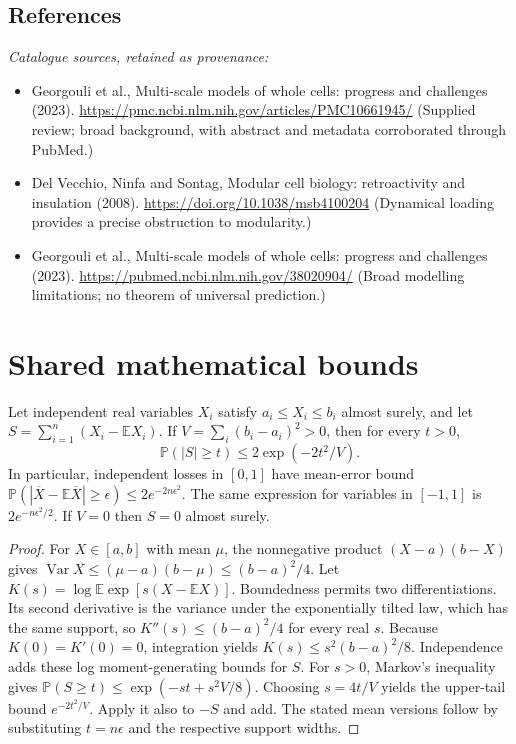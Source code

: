 \documentclass[11pt]{article}
\begin{document}
\subsection{References}
\noindent\emph{Catalogue sources, retained as provenance:}
\begin{itemize}
\item Georgouli et al., Multi-scale models of whole cells: progress and challenges (2023). \url{https://pmc.ncbi.nlm.nih.gov/articles/PMC10661945/} (Supplied review; broad background, with abstract and metadata corroborated through PubMed.)
\item Del Vecchio, Ninfa and Sontag, Modular cell biology: retroactivity and insulation (2008). \url{https://doi.org/10.1038/msb4100204} (Dynamical loading provides a precise obstruction to modularity.)
\item Georgouli et al., Multi-scale models of whole cells: progress and challenges (2023). \url{https://pubmed.ncbi.nlm.nih.gov/38020904/} (Broad modelling limitations; no theorem of universal prediction.)
\end{itemize}




\section{Shared mathematical bounds}\label{app:bounds}
\begin{lemma}\label{lem:bounded}
Let independent real variables $X_i$ satisfy $a_i\leq X_i\leq b_i$ almost surely,
and let $S=\sum_{i=1}^n(X_i-\mathbb{E} X_i)$. If
$V=\sum_i(b_i-a_i)^2>0$, then for every $t>0$,
\[
 \mathbb{P}(|S|\geq t)\leq 2\exp(-2t^2/V).
\]
In particular, independent losses in $[0,1]$ have mean-error bound
$\mathbb{P}(|\overline X-\mathbb{E}\overline X|\geq\epsilon)
\leq2e^{-2n\epsilon^2}$. The same expression for variables in $[-1,1]$
is $2e^{-n\epsilon^2/2}$. If $V=0$ then $S=0$ almost surely.
\end{lemma}
\begin{proof}
For $X\in[a,b]$ with mean $\mu$, the nonnegative product
$(X-a)(b-X)$ gives
$\operatorname{Var} X\leq(\mu-a)(b-\mu)\leq(b-a)^2/4$.
Let $K(s)=\log\mathbb{E}\exp[s(X-\mathbb{E} X)]$.
Boundedness permits two differentiations. Its second derivative is the variance
under the exponentially tilted law, which has the same support, so
$K''(s)\leq(b-a)^2/4$ for every real $s$.
Because $K(0)=K'(0)=0$, integration yields
$K(s)\leq s^2(b-a)^2/8$.
Independence adds these log moment-generating bounds for $S$.
For $s>0$, Markov's inequality gives
$\mathbb{P}(S\geq t)\leq\exp(-st+s^2V/8)$.
Choosing $s=4t/V$ yields the upper-tail bound $e^{-2t^2/V}$.
Apply it also to $-S$ and add. The stated mean versions follow by substituting
$t=n\epsilon$ and the respective support widths.
\end{proof}
\end{document}

